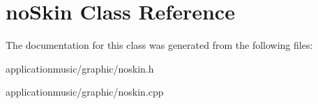 \hypertarget{classno_skin}{\section{no\-Skin Class Reference}
\label{classno_skin}
}


The documentation for this class was generated from the following files\-:\begin{DoxyCompactItemize}
\item 
applicationmusic/graphic/noskin.\-h\item 
applicationmusic/graphic/noskin.\-cpp\end{DoxyCompactItemize}
